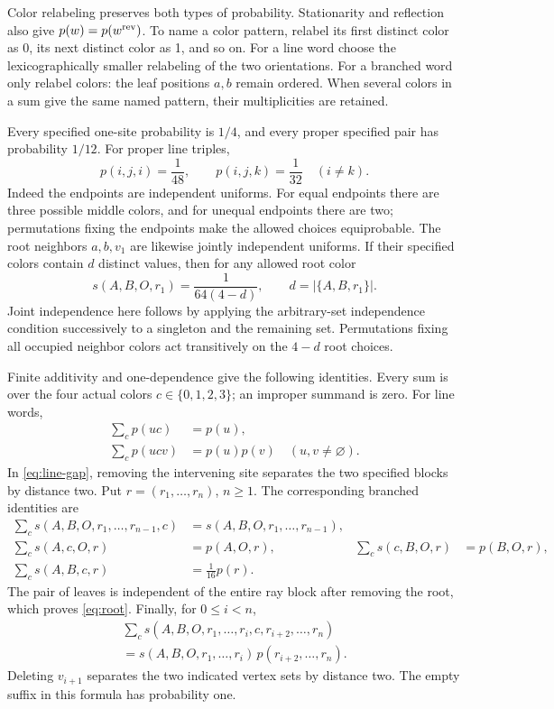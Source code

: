 \documentclass[11pt]{article}
\newcommand{\C}{\{0,1,2,3\}}
\begin{document}
Color relabeling preserves both types of probability. Stationarity and
reflection also give $p(w)=p(w^{\rm rev})$. To name a color pattern, relabel
its first distinct color as 0, its next distinct color as 1, and so on.
For a line word choose the lexicographically smaller relabeling of the two
orientations. For a branched word only relabel colors: the leaf positions
$a,b$ remain ordered. When several colors in a sum give the same named
pattern, their multiplicities are retained.

Every specified one-site probability is $1/4$, and every proper specified
pair has probability $1/12$. For proper line triples,
\begin{equation}\label{eq:short}
p(i,j,i)=\frac1{48},\qquad p(i,j,k)=\frac1{32}\quad(i\ne k).
\end{equation}
Indeed the endpoints are independent uniforms. For equal endpoints there
are three possible middle colors, and for unequal endpoints there are two;
permutations fixing the endpoints make the allowed choices equiprobable.
The root neighbors $a,b,v_1$ are likewise jointly independent uniforms.
If their specified colors contain $d$ distinct values, then for any allowed
root color
\begin{equation}\label{eq:star-short}
s(A,B,O,r_1)=\frac1{64(4-d)},\qquad d=|\{A,B,r_1\}|.
\end{equation}
Joint independence here follows by applying the arbitrary-set independence
condition successively to a singleton and the remaining set. Permutations
fixing all occupied neighbor colors act transitively on the $4-d$ root choices.

Finite additivity and one-dependence give the following identities. Every
sum is over the four actual colors $c\in\C$; an improper summand is zero.
For line words,
\begin{align}
\sum_c p(uc)&=p(u),\label{eq:line-marginal}\\
\sum_c p(ucv)&=p(u)p(v)\quad(u,v\ne\varnothing).
\label{eq:line-gap}
\end{align}
In \eqref{eq:line-gap}, removing the intervening site separates the two
specified blocks by distance two. Put $r=(r_1,\ldots,r_n)$, $n\geq1$.
The corresponding branched identities are
\begin{align}
\sum_c s(A,B,O,r_1,\ldots,r_{n-1},c)
&=s(A,B,O,r_1,\ldots,r_{n-1}),\label{eq:star-marginal}\\
\sum_c s(A,c,O,r)&=p(A,O,r),&
\sum_c s(c,B,O,r)&=p(B,O,r),\label{eq:leaf}\\
\sum_c s(A,B,c,r)&=\frac1{16}p(r).
\label{eq:root}
\end{align}
The pair of leaves is independent of the entire ray block after removing
the root, which proves \eqref{eq:root}. Finally, for $0\leq i<n$,
\begin{multline}\label{eq:star-gap}
\sum_c s(A,B,O,r_1,\ldots,r_i,c,r_{i+2},\ldots,r_n)\\
=s(A,B,O,r_1,\ldots,r_i)\,p(r_{i+2},\ldots,r_n).
\end{multline}
Deleting $v_{i+1}$ separates the two indicated vertex sets by distance two.
The empty suffix in this formula has probability one.
\end{document}
